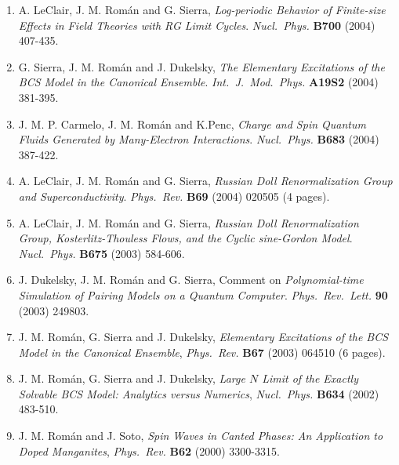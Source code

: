\documentclass{article}
\begin{document}
\begin{enumerate}

\item A. LeClair, J. M. Rom\'an and G. Sierra,
{\it Log-periodic Behavior of Finite-size Effects in Field Theories with RG Limit Cycles}.
{\it Nucl.~Phys.} {\bf B700} (2004) 407-435.

\item G. Sierra, J. M. Rom\'an and J. Dukelsky, 
{\it The Elementary Excitations of the BCS Model in the Canonical Ensemble}.
{\it Int.~J.~Mod.~Phys.} {\bf A19S2} (2004) 381-395.

\item J. M. P. Carmelo, J. M. Rom\'{a}n and K.Penc,
{\it Charge and Spin Quantum Fluids Generated by Many-Electron Interactions}.
{\it Nucl.~Phys.} {\bf B683} (2004) 387-422.

\item A. LeClair, J. M. Rom\'{a}n and G. Sierra, 
{\it Russian Doll Renormalization Group and Superconductivity}. 
{\it Phys.~Rev.} {\bf B69} (2004) 020505 (4 pages).

\item A. LeClair, J. M. Rom\'{a}n and G. Sierra, 
{\it Russian Doll Renormalization Group, Kosterlitz-Thouless Flows, 
and the Cyclic sine-Gordon Model}. 
{\it Nucl.~Phys.} {\bf B675} (2003) 584-606.

\item J. Dukelsky, J. M. Rom\'an and G. Sierra,
Comment on {\it Polynomial-time Simulation of Pairing Models 
on a Quantum Computer}.
{\it Phys.~Rev.~Lett.} {\bf 90} (2003) 249803.

\item J. M. Rom\'an, G. Sierra and J. Dukelsky, 
{\it Elementary Excitations of the BCS Model in the Canonical Ensemble},
{\it Phys.~Rev.} {\bf B67} (2003) 064510 (6 pages).

\item J. M. Rom\'an, G. Sierra and J. Dukelsky, 
{\it Large $N$ Limit of the Exactly Solvable BCS Model: 
Analytics versus Numerics},
{\it Nucl.~Phys.} {\bf B634} (2002) 483-510.

\item J. M. Rom\'an and J. Soto, 
{\it Spin Waves in Canted Phases: An Application to Doped Manganites}, 
{\it Phys.~Rev.} {\bf B62} (2000) 3300-3315.


\end{enumerate}
\end{document}
